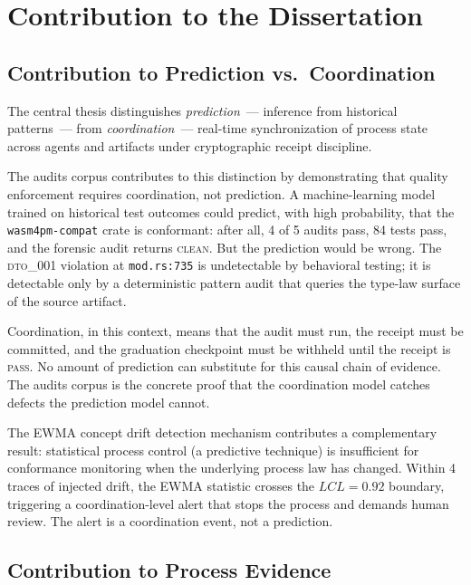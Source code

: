 
\section{Contribution to the Dissertation}
\label{sec:audits-contribution}

\subsection{Contribution to Prediction vs.\ Coordination}
\label{sec:audits-contribution-prediction}

The central thesis distinguishes \emph{prediction}~--- inference from historical
patterns~--- from \emph{coordination}~--- real-time synchronization of process
state across agents and artifacts under cryptographic receipt discipline.

The audits corpus contributes to this distinction by demonstrating that quality
enforcement requires coordination, not prediction. A machine-learning model
trained on historical test outcomes could predict, with high probability, that
the \texttt{wasm4pm-compat} crate is conformant: after all, 4 of 5 audits pass,
84 tests pass, and the forensic audit returns \textsc{clean}. But the prediction
would be wrong. The \textsc{dto\_001} violation at \texttt{mod.rs:735} is
undetectable by behavioral testing; it is detectable only by a deterministic
pattern audit that queries the type-law surface of the source artifact.

Coordination, in this context, means that the audit must run, the receipt must be
committed, and the graduation checkpoint must be withheld until the receipt is
\textsc{pass}. No amount of prediction can substitute for this causal chain of
evidence. The audits corpus is the concrete proof that the coordination model
catches defects the prediction model cannot.

The EWMA concept drift detection mechanism contributes a complementary result:
statistical process control (a predictive technique) is insufficient for
conformance monitoring when the underlying process law has changed. Within 4
traces of injected drift, the EWMA statistic crosses the \(LCL = 0.92\) boundary,
triggering a coordination-level alert that stops the process and demands human
review. The alert is a coordination event, not a prediction.

\subsection{Contribution to Process Evidence}
\label{sec:audits-contribution-evidence}

